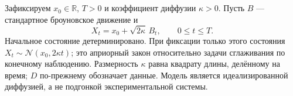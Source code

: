 \section{}
\label{sec:bridge}
{Зафиксируем $x_0\in\mathbb R$, $T>0$ и коэффициент диффузии $\kappa>0$. Пусть $B$ --- стандартное броуновское движение и}
\begin{equation}\label{eq:diffusion}
X_t=x_0+\sqrt{2\kappa}\,B_t,\qquad 0\le t\le T.
\end{equation}
{Начальное состояние детерминировано. При фиксации только этого состояния $X_t\sim\mathcal N(x_0,2\kappa t)$; это априорный закон относительно задачи сглаживания по конечному наблюдению. Размерность $\kappa$ равна квадрату длины, делённому на время; $D$ по-прежнему обозначает данные. Модель является идеализированной диффузией, а не подгонкой экспериментальной системы.}

